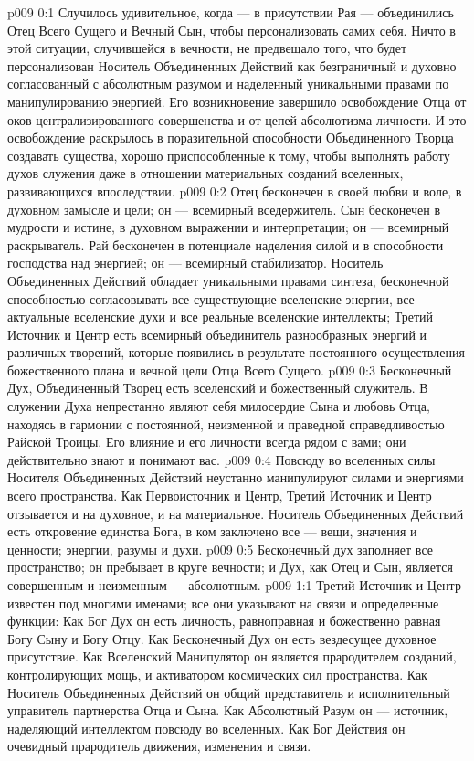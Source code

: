 \author{Божественный Советник}
\vs p009 0:1 Случилось удивительное, когда --- в присутствии Рая --- объединились Отец Всего Сущего и Вечный Сын, чтобы персонализовать самих себя. Ничто в этой ситуации, случившейся в вечности, не предвещало того, что будет персонализован Носитель Объединенных Действий как безграничный и духовно согласованный с абсолютным разумом и наделенный уникальными правами по манипулированию энергией. Его возникновение завершило освобождение Отца от оков централизированного совершенства и от цепей абсолютизма личности. И это освобождение раскрылось в поразительной способности Объединенного Творца создавать существа, хорошо приспособленные к тому, чтобы выполнять работу духов служения даже в отношении материальных созданий вселенных, развивающихся впоследствии.
\vs p009 0:2 \pc Отец бесконечен в своей любви и воле, в духовном замысле и цели; он --- всемирный вседержитель. Сын бесконечен в мудрости и истине, в духовном выражении и интерпретации; он --- всемирный раскрыватель. Рай бесконечен в потенциале наделения силой и в способности господства над энергией; он --- всемирный стабилизатор. Носитель Объединенных Действий обладает уникальными правами синтеза, бесконечной способностью согласовывать все существующие вселенские энергии, все актуальные вселенские духи и все реальные вселенские интеллекты; Третий Источник и Центр есть всемирный объединитель разнообразных энергий и различных творений, которые появились в результате постоянного осуществления божественного плана и вечной цели Отца Всего Сущего.
\vs p009 0:3 Бесконечный Дух, Объединенный Творец есть вселенский и божественный служитель. В служении Духа непрестанно являют себя милосердие Сына и любовь Отца, находясь в гармонии с постоянной, неизменной и праведной справедливостью Райской Троицы. Его влияние и его личности всегда рядом с вами; они действительно знают и понимают вас.
\vs p009 0:4 Повсюду во вселенных силы Носителя Объединенных Действий неустанно манипулируют силами и энергиями всего пространства. Как Первоисточник и Центр, Третий Источник и Центр отзывается и на духовное, и на материальное. Носитель Объединенных Действий есть откровение единства Бога, в ком заключено все --- вещи, значения и ценности; энергии, разумы и духи.
\vs p009 0:5 \pc Бесконечный дух заполняет все пространство; он пребывает в круге вечности; и Дух, как Отец и Сын, является совершенным и неизменным --- абсолютным.
\vs p009 1:1 Третий Источник и Центр известен под многими именами; все они указывают на связи и определенные функции: Как Бог Дух он есть личность, равноправная и божественно равная Богу Сыну и Богу Отцу. Как Бесконечный Дух он есть вездесущее духовное присутствие. Как Вселенский Манипулятор он является прародителем созданий, контролирующих мощь, и активатором космических сил пространства. Как Носитель Объединенных Действий он общий представитель и исполнительный управитель партнерства Отца и Сына. Как Абсолютный Разум он --- источник, наделяющий интеллектом повсюду во вселенных. Как Бог Действия он очевидный прародитель движения, изменения и связи.
